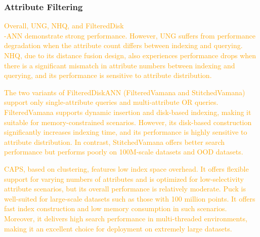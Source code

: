 \documentclass[sigconf, nonacm]{acmart}
\begin{document}
{\begin{table}[htbp]
\end{table}

	
	\subsubsection{\textbf{Attribute Filtering}}
\textcolor{orange}{
Overall, UNG, NHQ, and FilteredDisk\\-ANN demonstrate strong performance. However, UNG suffers from performance degradation when the attribute count differs between indexing and querying. NHQ, due to its distance fusion design, also experiences performance drops when there is a significant mismatch in attribute numbers between indexing and querying, and its performance is sensitive to attribute distribution. }

\textcolor{orange}{The two variants of FilteredDiskANN (FilteredVamana and StitchedVamana) support only single-attribute queries and multi-attribute OR queries. FilteredVamana supports dynamic insertion and disk-based indexing, making it suitable for memory-constrained scenarios. However, its disk-based construction significantly increases indexing time, and its performance is highly sensitive to attribute distribution. In contrast, StitchedVamana offers better search performance but performs poorly on 100M-scale datasets and OOD datasets.}

\textcolor{orange}{
CAPS, based on clustering, features low index space overhead. It offers flexible support for varying numbers of attributes and is optimized for low-selectivity attribute scenarios, but its overall performance is relatively moderate.
Puck is well-suited for large-scale datasets such as those with 100 million points. It offers fast index construction and low memory consumption in such scenarios. Moreover, it delivers high search performance in multi-threaded environments, making it an excellent choice for deployment on extremely large datasets.}


}
\end{document}
